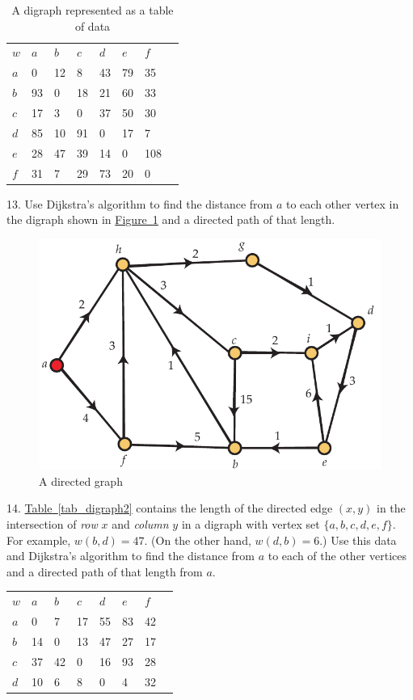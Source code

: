 \documentclass[10pt,]{book}
\theoremstyle{plain}
\theoremstyle{definition}
\theoremstyle{definition}
\theoremstyle{definition}
\theoremstyle{definition}
\numberwithin{equation}{section}
\newcommand{\hrulethin}  {\noalign{\hrule height 0.04em}}
\begin{document}
\begin{exerciselist}
\begin{table}
\begin{tabular}{lAllllll}
\(w\)&\(a\)&\(b\)&\(c\)&\(d\)&\(e\)&\(f\)\tabularnewline\hrulethin
\(a\)&0&12&8&43&79&35\tabularnewline[0pt]
\(b\)&93&0&18&21&60&33\tabularnewline[0pt]
\(c\)&17&3&0&37&50&30\tabularnewline[0pt]
\(d\)&85&10&91&0&17&7\tabularnewline[0pt]
\(e\)&28&47&39&14&0&108\tabularnewline[0pt]
\(f\)&31&7&29&73&20&0
\end{tabular}
\caption{A digraph represented as a table of data\label{tab_digraph1}}
\end{table}
\par\smallskip
\item[13.]\hypertarget{exercise-25}{}\hypertarget{p-258}{}%
Use Dijkstra's algorithm to find the distance from \(a\) to each other vertex in the digraph shown in \hyperref[fig_graphalgorithms_dijkstra_ex2]{Figure~\ref{fig_graphalgorithms_dijkstra_ex2}} and a directed path of that length.%
\begin{figure}
\centering
\includegraphics[width=0.65\linewidth]{images/dijkstra_ex2}
\caption{A directed graph\label{fig_graphalgorithms_dijkstra_ex2}}
\end{figure}
\par\smallskip
\item[14.]\hypertarget{exercise-26}{}\hypertarget{p-259}{}%
\hyperref[tab_digraph2]{Table~\ref{tab_digraph2}} contains the length of the directed edge \((x,y)\) in the intersection of \emph{row} \(x\) and \emph{column} \(y\) in a digraph with vertex set \(\{a,b,c,d,e,f\}\). For example, \(w(b,d)=47\). (On the other hand, \(w(d,b)=6\).) Use this data and Dijkstra's algorithm to find the distance from \(a\) to each of the other vertices and a directed path of that length from \(a\).%
\begin{table}
\centering
\begin{tabular}{lAllllll}
\(w\)&\(a\)&\(b\)&\(c\)&\(d\)&\(e\)&\(f\)\tabularnewline\hrulethin
\(a\)&0&7&17&55&83&42\tabularnewline[0pt]
\(b\)&14&0&13&47&27&17\tabularnewline[0pt]
\(c\)&37&42&0&16&93&28\tabularnewline[0pt]
\(d\)&10&6&8&0&4&32\tabularnewline[0pt]

\end{tabular}
\end{table}
\end{exerciselist}
\end{document}
